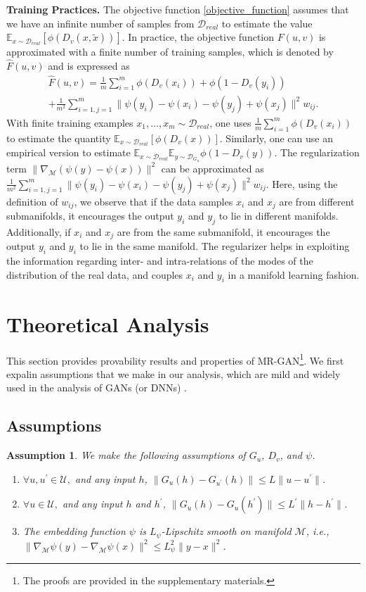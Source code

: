 \documentclass[10pt,twocolumn,letterpaper]{article}
\newcommand{\nn}{\nonumber}
\newcommand{\g}{{G_u}}
\newcommand{\di}{{D_v}}
\newcommand{\U}{\mathcal{U}}
\newcommand{\D}{\mathcal{D}}
\newcommand{\E}{\mathbb{E}}
\newcommand{\xt}{{\tilde{x}}}
\newcommand{\M}{\mathcal{M}}
\newtheorem{as}{Assumption}
\begin{document}
{\textbf{Training Practices.}} The objective function \eqref{objective_function} assumes that we have an infinite number of samples from $\D_{real}$ to estimate the value $\E_{x\sim \D_{real}} [\phi (\di(x,\xt))]$. In practice, the objective function $F(u,v)$ is approximated with a finite number of training samples, which is denoted by $\hat{F}(u,v)$ and is expressed as
\begin{align}
\label{mr-emp}
    \hat{F}(u,v)=\frac{1}{m}\sum_{i=1}^{m} \phi(\di(x_i)) + \phi(1-\di(y_i))\nn\\
    +\frac{1}{m^2}\sum_{i=1,j=1}^{m}\|\psi(y_i)-\psi(x_i)-\psi(y_j)+\psi(x_j)\|^2w_{ij}.
\end{align}
With finite training examples
$x_1, \ldots,x_m \sim \D_{real}$, one uses $\frac{1}{m}\sum_{i=1}^{m} \phi(\di(x_i))$ to estimate the quantity $\E_{x\sim \D_{real}} [\phi (\di(x))]$. Similarly, one can use an empirical version to estimate ${\E}_{x\sim \D_{real}}{\E}_{y\sim \D_{\g}} \phi(1-\di(y))$. The regularization term $\|\nabla_\M (\psi(y)-\psi(x))\|^2$ can be approximated as $\frac{1}{m^2}\sum_{i=1,j=1}^{m}\|\psi(y_i)-\psi(x_i)-\psi(y_j)+\psi(x_j)\|^2w_{ij}$. Here, using the definition of $w_{ij}$, we observe that if the data samples $x_i$ and $x_j$ are from different submanifolds, it encourages the output $y_i$ and $y_j$ to lie in different manifolds. Additionally, if $x_i$ and $x_j$ are from the same submanifold, it encourages the output $y_i$ and $y_i$ to lie in the same manifold. The regularizer helps in exploiting the information regarding inter- and intra-relations of the modes of the distribution of the real data, and couples $x_i$ and $y_i$  in a manifold learning fashion.


\section{Theoretical Analysis}
This section provides provability results and properties of MR-GAN\footnote{The proofs are provided in the supplementary materials.}. We first expalin assumptions that we make in our analysis, which are mild and widely used in the analysis of GANs (or DNNs) \cite{ruan2018reachability,arora2017generalization}.
\subsection{Assumptions}
\begin{as}\label{as_1}We make the following assumptions of $G_u$, $D_v$, and $\psi$.
	\begin{enumerate}[label=(\alph*)]
		\item $\forall  u,u^\prime \in \U, $ and any input $h$, $\|\g(h) - G_{u^\prime}(h)\| \le L\|u - u^\prime\|$.
		\item $\forall  u \in \U, $ and any input $h$ and $h^\prime$, $\|\g(h) -\g(h^\prime)\| \le L^\prime\|h - h^\prime\|$.
		\item The embedding function $\psi$ is $L_\psi$-Lipschitz smooth on manifold $\M$, i.e., $\|\nabla_\M \psi(y)-\nabla_\M\psi(x)\|^2 \le L_\psi^2 \|y-x\|^2$.
	\end{enumerate}	
\end{as}
\end{document}
